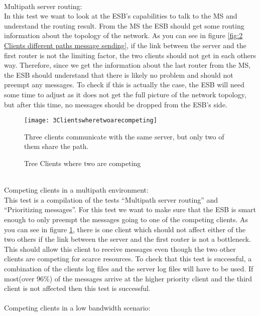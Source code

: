 \\    
Multipath server routing:\\
    In this test we want to look at the ESB’s capabilities to talk to the MS and understand the routing result. From the MS the ESB should get some routing information about the topology of the network. As you can see in figure \ref{fig:2 Clients different paths message sending}, if the link between the server and the first router is not the limiting factor, the two clients should not get in each others way. Therefore, since we get the information about the last router from the MS, the ESB should understand that there is likely no problem and should not preempt any messages. To check if this is actually the case, the ESB will need some time to adjust as it does not get the full picture of the network topology, but after this time, no messages should be dropped from the ESB’s side.
\\
    \begin{figure}[h]
        \centering
        \texttt{[image: 3Clientswheretwoarecompeting]}
        \caption{Tree Clients where two are competing}
        Three clients communicate with the same server, but only two of them share the path.
        \label{fig:3clientstwocompeting}
    \end{figure}
\\
Competing clients in a multipath environment:\\
    This test is a compilation of the tests “Multipath server routing” and “Prioritizing messages”. For this test we want to make sure that the ESB is smart enough to only preempt the messages going to one of the competing clients. As you can see in figure \ref{fig:3clientstwocompeting}, there is one client which should not affect either of the two others if the link between the server and the first router is not a bottleneck. This should allow this client to receive messages even though the two other clients are competing for scarce resources. To check that this test is successful, a combination of the clients log files and the server log files will have to be used. If most(over 96\%) of the messages arrive at the higher priority client and the third client is not affected then this test is successful.
\\\\
Competing clients in a low bandwidth scenario:\\
